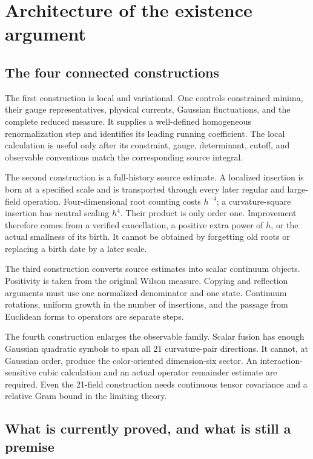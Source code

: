 \section{Architecture of the existence argument}
\label{sec:architecture}

\subsection{The four connected constructions}

The first construction is local and variational. One controls constrained
minima, their gauge representatives, physical currents, Gaussian
fluctuations, and the complete reduced measure. It supplies a well-defined
homogeneous renormalization step and identifies its leading running
coefficient. The local calculation is useful only after its constraint,
gauge, determinant, cutoff, and observable conventions match the
corresponding source integral.

The second construction is a full-history source estimate. A localized
insertion is born at a specified scale and is transported through every
later regular and large-field operation. Four-dimensional root counting
costs \(h^{-4}\); a curvature-square insertion has neutral scaling
\(h^4\). Their product is only order one. Improvement therefore comes
from a verified cancellation, a positive extra power of \(h\), or the
actual smallness of its birth. It cannot be obtained by forgetting old
roots or replacing a birth date by a later scale.

The third construction converts source estimates into scalar continuum
objects. Positivity is taken from the original Wilson measure. Copying
and reflection arguments must use one normalized denominator and one
state. Continuum rotations, uniform growth in the number of insertions,
and the passage from Euclidean forms to operators are separate steps.

The fourth construction enlarges the observable family. Scalar fusion
has enough Gaussian quadratic symbols to span all 21 curvature-pair
directions. It cannot, at Gaussian order, produce the color-oriented
dimension-six sector. An interaction-sensitive cubic calculation and
an actual operator remainder estimate are required. Even the 21-field
construction needs continuous tensor covariance and a relative Gram
bound in the limiting theory.

\subsection{What is currently proved, and what is still a premise}

